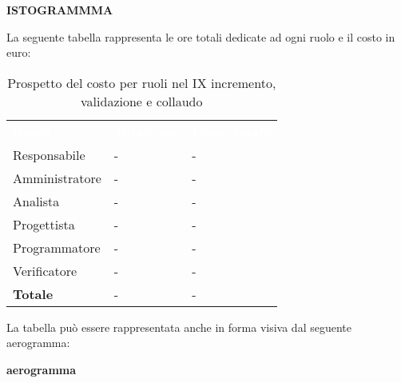 \textbf{ISTOGRAMMMA}


La seguente tabella rappresenta le ore totali dedicate ad ogni ruolo e il costo in euro:

\begin{table}[!htbp]
\begin{center}
\renewcommand{\arraystretch}{1.5}
\begin{tabular}{ m{}<{\centering}  m{}<{\centering} m{}<{\centering}}
	\rowcolor{darkblue}
	\textcolor{white}{\textbf{Ruolo}}&\textcolor{white}{\textbf{Totale ore}}&\textcolor{white}{\textbf{Costo totale}}\\ 

	Responsabile  & - & - \\	

	Amministratore & - & - \\
	
	Analista & - & - \\
	
	Progettista & - & - \\
	
	Programmatore & - & - \\
	
	Verificatore & - & - \\
	
	\textbf{Totale} & - & - \\
	
\end{tabular}
\caption{Prospetto del costo per ruoli nel IX incremento,  validazione e collaudo}
\end{center}
\end{table}

La tabella può essere rappresentata anche in forma visiva dal seguente aerogramma:

\textbf{aerogramma}

